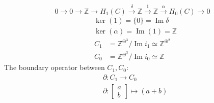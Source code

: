 \documentclass[11pt,a4paper]{report}
\DeclareMathOperator{\Ima}{Im}
\begin{document}
\begin{Ex}
                \[
                0 \rightarrow 0 \rightarrow \mathbb{Z} \rightarrow H_1(C) \xrightarrow{\delta} \mathbb{Z} \xrightarrow{1} \mathbb{Z} \xrightarrow{\alpha} H_0(C) \rightarrow 0
                \]
                \begin{align*}
                  &\ker(1) = \{0\} = \Ima \delta\\
                  &\ker(\alpha) = \Ima(1) = \mathbb{Z}
                \end{align*}
                \begin{align*}
                  C_1 &= \mathbb{Z}^{\oplus^{3}} / \Ima i_1 \simeq \mathbb{Z}^{\oplus^{2}}\\
                  C_0 &= \mathbb{Z}^{\oplus^{3}} / \Ima i_0 \simeq \mathbb{Z}
                \end{align*}
                The boundary operator between $C_1, C_0$:
                  \begin{align*}
                 &\partial: C_1 \rightarrow C_0 \\
                 &\partial: \begin{bmatrix}
                    a\\b
                  \end{bmatrix}
                  \mapsto (a+b)
                \end{align*}



\end{Ex}
\end{document}
